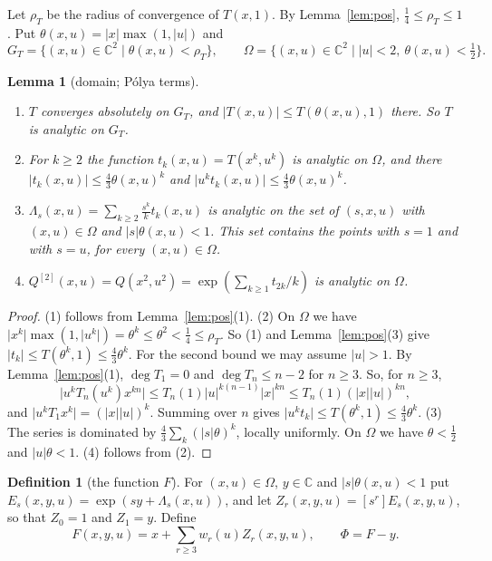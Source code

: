 \documentclass[11pt]{amsart}
\newtheorem{lemma}[theorem]{Lemma}
\theoremstyle{definition}
\newtheorem{definition}[theorem]{Definition}
\theoremstyle{remark}
\numberwithin{equation}{section}
\newcommand{\CC}{\mathbb{C}}
\newcommand{\abs}[1]{\lvert #1\rvert}
\begin{document}
Let \(\rho_T\) be the radius of convergence of \(T(x,1)\). By Lemma~\ref{lem:pos}, \(\frac14\le\rho_T\le1\). Put \(\theta(x,u)=\abs{x}\max(1,\abs{u})\) and
\[
G_T=\{(x,u)\in\CC^2\mid \theta(x,u)<\rho_T\},\qquad
\Omega=\{(x,u)\in\CC^2\mid \abs{u}<2,\ \theta(x,u)<\tfrac12\}.
\]

\begin{lemma}[domain; P\'olya terms]\label{lem:domain}
\begin{enumerate}
\item \(T\) converges absolutely on \(G_T\), and \(\abs{T(x,u)}\le T(\theta(x,u),1)\) there. So \(T\) is analytic on \(G_T\).
\item For \(k\ge2\) the function \(t_k(x,u)=T(x^k,u^k)\) is analytic on \(\Omega\), and there \(\abs{t_k(x,u)}\le\frac43\theta(x,u)^k\) and \(\abs{u^kt_k(x,u)}\le\frac43\theta(x,u)^k\).
\item \(\Lambda_s(x,u)=\sum_{k\ge2}\frac{s^k}{k}t_k(x,u)\) is analytic on the set of \((s,x,u)\) with \((x,u)\in\Omega\) and \(\abs{s}\theta(x,u)<1\). This set contains the points with \(s=1\) and with \(s=u\), for every \((x,u)\in\Omega\).
\item \(Q^{[2]}(x,u)=Q(x^2,u^2)=\exp(\sum_{k\ge1}t_{2k}/k)\) is analytic on \(\Omega\).
\end{enumerate}
\end{lemma}

\begin{proof}
(1) follows from Lemma~\ref{lem:pos}(1). (2) On \(\Omega\) we have \(\abs{x^k}\max(1,\abs{u^k})=\theta^k\le\theta^2<\frac14\le\rho_T\). So (1) and Lemma~\ref{lem:pos}(3) give \(\abs{t_k}\le T(\theta^k,1)\le\frac43\theta^k\). For the second bound we may assume \(\abs{u}>1\). By Lemma~\ref{lem:pos}(1), \(\deg T_1=0\) and \(\deg T_n\le n-2\) for \(n\ge3\). So, for \(n\ge3\),
\[
\abs{u^kT_n(u^k)x^{kn}}\le T_n(1)\abs{u}^{k(n-1)}\abs{x}^{kn}\le T_n(1)(\abs{x}\abs{u})^{kn},
\]
and \(\abs{u^kT_1x^k}=(\abs{x}\abs{u})^k\). Summing over \(n\) gives \(\abs{u^kt_k}\le T(\theta^k,1)\le\frac43\theta^k\). (3) The series is dominated by \(\frac43\sum_k(\abs{s}\theta)^k\), locally uniformly. On \(\Omega\) we have \(\theta<\frac12\) and \(\abs{u}\theta<1\). (4) follows from (2).
\end{proof}

\begin{definition}[the function \(F\)]\label{def:F}
For \((x,u)\in\Omega\), \(y\in\CC\) and \(\abs{s}\theta(x,u)<1\) put \(E_s(x,y,u)=\exp(sy+\Lambda_s(x,u))\), and let \(Z_r(x,y,u)=[s^r]E_s(x,y,u)\), so that \(Z_0=1\) and \(Z_1=y\). Define
\begin{equation}\label{eq:F}
F(x,y,u)=x+\sum_{r\ge3}w_r(u)Z_r(x,y,u),\qquad \Phi=F-y.
\end{equation}
\end{definition}
\end{document}

